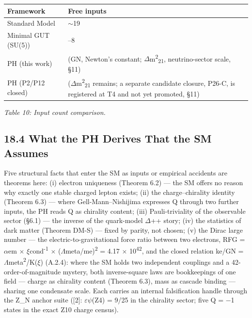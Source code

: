 \documentclass[11pt,letterpaper]{article}
\begin{document}
\begin{footnotesize}\begin{longtable}{|>{\raggedright\arraybackslash}p{}|>{\raggedright\arraybackslash}p{}|}
\hline
\textbf{Framework} & \textbf{Free inputs} \\ \hline
Standard Model & $\sim$19 \\ \hline
Minimal GUT (SU(5)) & 5--8 \\ \hline
PH (this work) & 2 (GN, Newton's constant; $\Delta$m\textsuperscript{2}\textsubscript{21}, neutrino-sector scale, §11) \\ \hline
PH (P2/P12 closed) & 1 ($\Delta$m\textsuperscript{2}\textsubscript{21} remains; a separate candidate closure, P26-C, is registered at T4 and not yet promoted, §11) \\ \hline
\end{longtable}\end{footnotesize}

\begingroup\centering\footnotesize\itshape Table 10: Input count comparison.\par\endgroup

\subsection*{18.4  What the PH Derives That the SM Assumes}

\noindent Five structural facts that enter the SM as inputs or empirical accidents are theorems here: (i) electron uniqueness (Theorem 6.2) --- the SM offers no reason why exactly one stable charged lepton exists; (ii) the charge--chirality identity (Theorem 6.3) --- where Gell-Mann--Nishijima expresses Q through two further inputs, the PH reads Q as chirality content; (iii) Pauli-triviality of the observable sector (§6.1) --- the inverse of the quark-model $\Delta$++ story; (iv) the statistics of dark matter (Theorem DM-S) --- fixed by parity, not chosen; (v) the Dirac large number --- the electric-to-gravitational force ratio between two electrons, RFG = $\alpha$em $\times$ $\xi$cond\textsuperscript{-1} $\times$ ($\Lambda$meta/me)\textsuperscript{2} = 4.17 $\times$ 10\textsuperscript{42}, and the closed relation ke/GN = $\Lambda$meta\textsuperscript{2}/K($\xi$) (A.2.4): where the SM holds two independent couplings and a 42-order-of-magnitude mystery, both inverse-square laws are bookkeepings of one field --- charge as chirality content (Theorem 6.3), mass as cascade binding --- sharing one condensate scale. Each carries an internal falsification handle through the Z\_N anchor suite ([2]: $\varepsilon$$\psi$(Z4) = 9/25 in the chirality sector; five Q = $-$1 states in the exact Z10 charge census).
\end{document}
